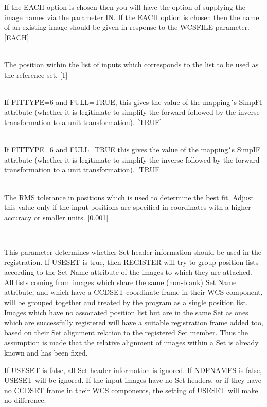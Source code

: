 \documentclass[twoside,11pt]{article}
\renewcommand{\_}{\texttt{\symbol{95}}}
\newcommand{\routine}[1]{{\sc #1}}
\newcommand{\sstsubsection}[1]{ \item[{#1}] \mbox{} \\}
\newcommand{\sstsubsection}[1]{\item[{#1}]}
\begin{document}
{{{{         }
         If the EACH option is chosen then you will have the option of
         supplying the image names via the parameter IN. If the EACH
         option is chosen then the name of an existing image should be
         given in response to the WCSFILE parameter.
         [EACH]
      }
      \sstsubsection{
         REFPOS = \_INTEGER (Read)
      } {
         The position within the list of inputs which corresponds to
         the list to be used as the reference set.
         [1]
      }
      \sstsubsection{
         SIMPFI = \_LOGICAL (Read)
      }{
         If FITTYPE=6 and FULL=TRUE, this gives the value of the
         mapping{\tt '}s SimpFI attribute (whether it is legitimate to simplify
         the forward followed by the inverse transformation to a unit
         transformation).
         [TRUE]
      }
      \sstsubsection{
         SIMPIF = \_LOGICAL (Read)
      }{
         If FITTYPE=6 and FULL=TRUE this gives the value of the
         mapping{\tt '}s SimpIF attribute (whether it is legitimate to simplify
         the inverse followed by the forward transformation to a unit
         transformation).
         [TRUE]
      }
      \sstsubsection{
         TOLER = \_DOUBLE (Read)
      } {
        The RMS tolerance in positions which is used to determine the
        best fit. Adjust this value only if the input positions are
        specified in coordinates with a higher accuracy or smaller
        units.
        [0.001]
      }
      \sstsubsection{
         USESET = \_LOGICAL (Read)
      } {
         This parameter determines whether Set header information should
         be used in the registration.  If USESET is true, then
         \routine{REGISTER} will try to group position lists according to
         the Set Name attribute of the images to which they are attached.
         All lists coming from images which share the same (non-blank)
         Set Name attribute, and which have a CCD\_SET coordinate 
         frame in their WCS component, will be grouped together and
         treated by the program as a single position list.  Images
         which have no associated position list but are in the same
         Set as ones which are successfully registered will have
         a suitable registration frame added too, based on their 
         Set alignment relation to the registered Set member.
         Thus the assumption is made that the relative alignment of 
         images within a Set is already known and has been fixed.

         If USESET is false, all Set header information is ignored.
         If NDFNAMES is false, USESET will be ignored.  If the input 
         images have no Set headers, or if they have no CCD\_SET frame 
         in their WCS components, the setting of USESET will make
         no difference.

}}}
\end{document}
